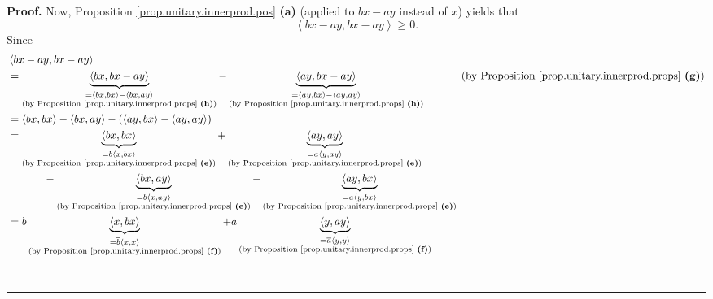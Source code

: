 \documentclass[numbers=enddot,12pt,final,onecolumn,notitlepage]{scrartcl}%
\numberwithin{exer}{subsection}
\theoremstyle{definition}
\newenvironment{proof}[1][Proof]{\noindent\textbf{#1.} }{\ \rule{0.5em}{0.5em}}
\begin{document}
\begin{proof}
Now, Proposition \ref{prop.unitary.innerprod.pos} \textbf{(a)} (applied to
$bx-ay$ instead of $x$) yields that
\begin{equation}
\left\langle bx-ay,bx-ay\right\rangle \geq0.
\label{pf.thm.unitary.innerprod.cs.main}%
\end{equation}
Since%
\begin{align*}
&  \left\langle bx-ay,bx-ay\right\rangle \\
&  =\underbrace{\left\langle bx,bx-ay\right\rangle }_{\substack{=\left\langle
bx,bx\right\rangle -\left\langle bx,ay\right\rangle \\\text{(by Proposition
\ref{prop.unitary.innerprod.props} \textbf{(h)})}}}-\underbrace{\left\langle
ay,bx-ay\right\rangle }_{\substack{=\left\langle ay,bx\right\rangle
-\left\langle ay,ay\right\rangle \\\text{(by Proposition
\ref{prop.unitary.innerprod.props} \textbf{(h)})}}}\ \ \ \ \ \ \ \ \ \ \left(
\text{by Proposition \ref{prop.unitary.innerprod.props} \textbf{(g)}}\right)
\\
&  =\left\langle bx,bx\right\rangle -\left\langle bx,ay\right\rangle -\left(
\left\langle ay,bx\right\rangle -\left\langle ay,ay\right\rangle \right) \\
&  =\underbrace{\left\langle bx,bx\right\rangle }_{\substack{=b\left\langle
x,bx\right\rangle \\\text{(by Proposition \ref{prop.unitary.innerprod.props}
\textbf{(e)})}}}+\underbrace{\left\langle ay,ay\right\rangle }%
_{\substack{=a\left\langle y,ay\right\rangle \\\text{(by Proposition
\ref{prop.unitary.innerprod.props} \textbf{(e)})}}}\\
&  \ \ \ \ \ \ \ \ \ \ -\underbrace{\left\langle bx,ay\right\rangle
}_{\substack{=b\left\langle x,ay\right\rangle \\\text{(by Proposition
\ref{prop.unitary.innerprod.props} \textbf{(e)})}}}-\underbrace{\left\langle
ay,bx\right\rangle }_{\substack{=a\left\langle y,bx\right\rangle \\\text{(by
Proposition \ref{prop.unitary.innerprod.props} \textbf{(e)})}}}\\
&  =b\underbrace{\left\langle x,bx\right\rangle }_{\substack{=\overline
{b}\left\langle x,x\right\rangle \\\text{(by Proposition
\ref{prop.unitary.innerprod.props} \textbf{(f)})}}}+a\underbrace{\left\langle
y,ay\right\rangle }_{\substack{=\overline{a}\left\langle y,y\right\rangle
\\\text{(by Proposition \ref{prop.unitary.innerprod.props} \textbf{(f)})}}}\\

\end{align*}
\end{proof}
\end{document}
